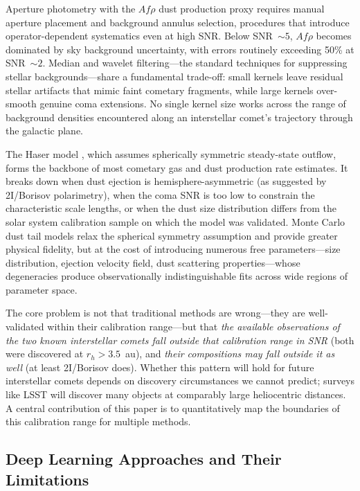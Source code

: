 \documentclass[usenatbib]{mnras}
\begin{document}
Aperture photometry with the $Af\rho$ dust production proxy \citep{lamy04,ahearn95} requires manual aperture placement and background annulus selection, procedures that introduce operator-dependent systematics even at high SNR. Below SNR~$\sim 5$, $Af\rho$ becomes dominated by sky background uncertainty, with errors routinely exceeding 50\% at SNR~$\sim 2$. Median and wavelet filtering---the standard techniques for suppressing stellar backgrounds---share a fundamental trade-off: small kernels leave residual stellar artifacts that mimic faint cometary fragments, while large kernels over-smooth genuine coma extensions. No single kernel size works across the range of background densities encountered along an interstellar comet's trajectory through the galactic plane.

The Haser model \citep{haser57}, which assumes spherically symmetric steady-state outflow, forms the backbone of most cometary gas and dust production rate estimates. It breaks down when dust ejection is hemisphere-asymmetric (as suggested by 2I/Borisov polarimetry), when the coma SNR is too low to constrain the characteristic scale lengths, or when the dust size distribution differs from the solar system calibration sample on which the model was validated. Monte Carlo dust tail models \citep{fulle10} relax the spherical symmetry assumption and provide greater physical fidelity, but at the cost of introducing numerous free parameters---size distribution, ejection velocity field, dust scattering properties---whose degeneracies produce observationally indistinguishable fits across wide regions of parameter space.

The core problem is not that traditional methods are wrong---they are well-validated within their calibration range---but that \textit{the available observations of the two known interstellar comets fall outside that calibration range in SNR} (both were discovered at $r_h > 3.5$~au), and \textit{their compositions may fall outside it as well} (at least 2I/Borisov does). Whether this pattern will hold for future interstellar comets depends on discovery circumstances we cannot predict; surveys like LSST will discover many objects at comparably large heliocentric distances. A central contribution of this paper is to quantitatively map the boundaries of this calibration range for multiple methods.

\subsection{Deep Learning Approaches and Their Limitations}
\end{document}

